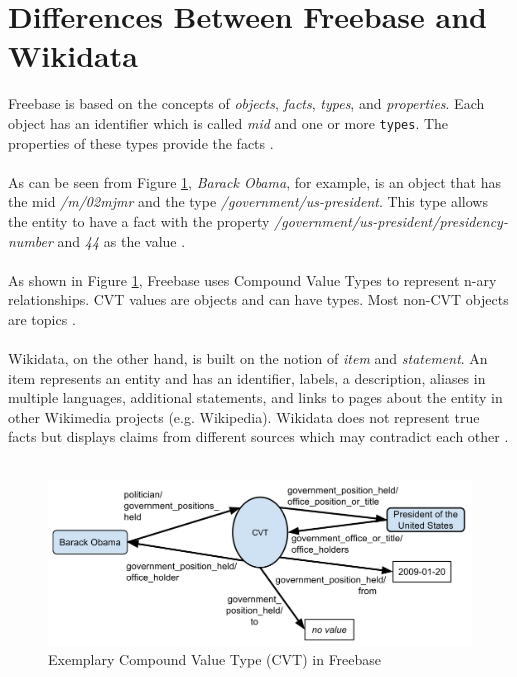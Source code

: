 ﻿\documentclass[11pt,titlepage,oneside,openany]{book}
\begin{document}
\section{Differences Between Freebase and Wikidata}
Freebase is based on the concepts of \textit{objects}, \textit{facts}, \textit{types}, and \textit{properties}. Each object has an identifier which is called \textit{mid} and one or more \texttt{types}. The properties of these types provide the facts \cite{Tanon2016FromFT}. 
\\
\\
As can be seen from Figure \ref{fig:exemplary-compound-value-type-freebase}, \textit{Barack Obama}, for example, is an object that has the mid \textit{/m/02mjmr} and the type \textit{/government/us-president}. This type allows the entity to have a fact with the property \textit{/government/us-president/presidency-number} and \textit{44} as the value \cite{Tanon2016FromFT}.
\\
\\
As shown in Figure \ref{fig:exemplary-compound-value-type-freebase}, Freebase uses Compound Value Types to represent n-ary relationships. CVT values are objects and can have types. Most non-CVT objects are topics \cite{Tanon2016FromFT}.
\\
\\
Wikidata, on the other hand, is built on the notion of \textit{item} and \textit{statement}. An item represents an entity and has an identifier, labels, a description, aliases in multiple languages, additional statements, and links to pages about the entity in other Wikimedia projects (e.g. Wikipedia). Wikidata does not represent true facts but displays claims from different sources which may contradict each other \cite{Tanon2016FromFT}.
\\
\\

\begin{figure}
	\begin{center}
	\includegraphics[width=13cm]{./figures/exemplary-compound-value-type-freebase.png}
	\caption[Exemplary Compound Value Type (CVT) in Freebase]{Exemplary Compound Value Type (CVT) in Freebase \cite{Tanon2016FromFT}}
	\label{fig:exemplary-compound-value-type-freebase}
	\end{center}
\end{figure}
\end{document}
